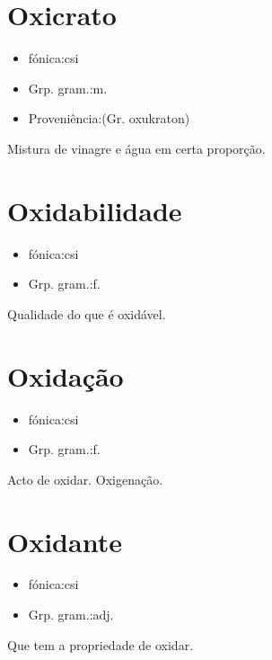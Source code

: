 \section{Oxicrato}
\begin{itemize}
\item {fónica:csi}
\end{itemize}
\begin{itemize}
\item {Grp. gram.:m.}
\end{itemize}
\begin{itemize}
\item {Proveniência:(Gr. \textunderscore oxukraton\textunderscore )}
\end{itemize}
Mistura de vinagre e água em certa proporção.
\section{Oxidabilidade}
\begin{itemize}
\item {fónica:csi}
\end{itemize}
\begin{itemize}
\item {Grp. gram.:f.}
\end{itemize}
Qualidade do que é oxidável.
\section{Oxidação}
\begin{itemize}
\item {fónica:csi}
\end{itemize}
\begin{itemize}
\item {Grp. gram.:f.}
\end{itemize}
Acto de oxidar.
Oxigenação.
\section{Oxidante}
\begin{itemize}
\item {fónica:csi}
\end{itemize}
\begin{itemize}
\item {Grp. gram.:adj.}
\end{itemize}
Que tem a propriedade de oxidar.
